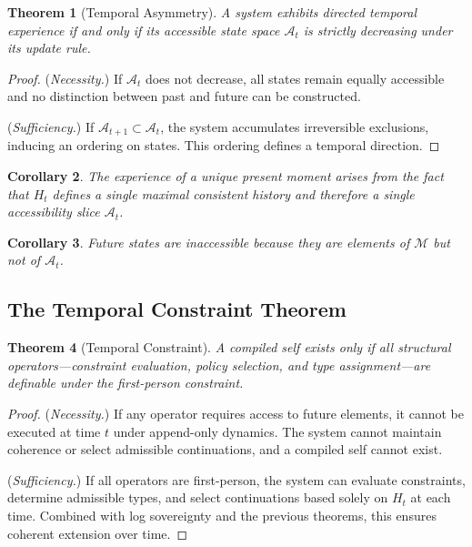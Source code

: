\documentclass[12pt, a4paper]{article}
\theoremstyle{plain}
\newtheorem{theorem}{Theorem}[section]
\newtheorem{corollary}[theorem]{Corollary}
\theoremstyle{definition}
\theoremstyle{remark}
\begin{document}
\begin{theorem}[Temporal Asymmetry]
\label{thm:temporal}
A system exhibits directed temporal experience if and only if its accessible state space $\mathcal{A}_t$ is strictly decreasing under its update rule.
\end{theorem}

\begin{proof}
(\textit{Necessity.}) If $\mathcal{A}_t$ does not decrease, all states remain equally accessible and no distinction between past and future can be constructed.

(\textit{Sufficiency.}) If $\mathcal{A}_{t+1} \subset \mathcal{A}_t$, the system accumulates irreversible exclusions, inducing an ordering on states. This ordering defines a temporal direction.
\end{proof}

\begin{corollary}
The experience of a unique present moment arises from the fact that $H_t$ defines a single maximal consistent history and therefore a single accessibility slice $\mathcal{A}_t$.
\end{corollary}

\begin{corollary}
Future states are inaccessible because they are elements of $\mathcal{M}$ but not of $\mathcal{A}_t$.
\end{corollary}

\subsection{The Temporal Constraint Theorem}

\begin{theorem}[Temporal Constraint]
A compiled self exists only if all structural operators---constraint evaluation, policy selection, and type assignment---are definable under the first-person constraint.
\end{theorem}

\begin{proof}
(\textit{Necessity.}) If any operator requires access to future elements, it cannot be executed at time $t$ under append-only dynamics. The system cannot maintain coherence or select admissible continuations, and a compiled self cannot exist.

(\textit{Sufficiency.}) If all operators are first-person, the system can evaluate constraints, determine admissible types, and select continuations based solely on $H_t$ at each time. Combined with log sovereignty and the previous theorems, this ensures coherent extension over time.
\end{proof}
\end{document}
